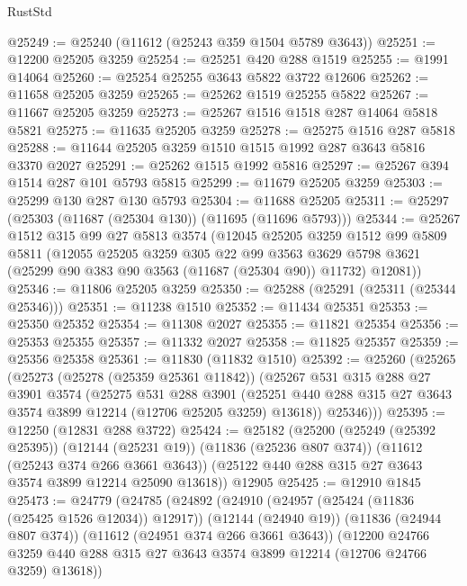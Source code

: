 \begin{lexlean}{RustStd}
\begin{coremodule}
@25249 := @25240 (@11612 (@25243 @359 @1504 @5789 @3643))
@25251 := @12200 @25205 @3259
@25254 := @25251 @420 @288 @1519
@25255 := @1991 @14064
@25260 := @25254 @25255 @3643 @5822 @3722 @12606
@25262 := @11658 @25205 @3259
@25265 := @25262 @1519 @25255 @5822
@25267 := @11667 @25205 @3259
@25273 := @25267 @1516 @1518 @287 @14064 @5818 @5821
@25275 := @11635 @25205 @3259
@25278 := @25275 @1516 @287 @5818
@25288 := @11644 @25205 @3259 @1510 @1515 @1992 @287 @3643 @5816 @3370 @2027
@25291 := @25262 @1515 @1992 @5816
@25297 := @25267 @394 @1514 @287 @101 @5793 @5815
@25299 := @11679 @25205 @3259
@25303 := @25299 @130 @287 @130 @5793
@25304 := @11688 @25205
@25311 := @25297 (@25303 (@11687 (@25304 @130)) (@11695 (@11696 @5793)))
@25344 := @25267
    @1512
    @315
    @99
    @27
    @5813
    @3574
    (@12045
      @25205
      @3259
      @1512
      @99
      @5809
      @5811
      (@12055
        @25205
        @3259
        @305
        @22
        @99
        @3563
        @3629
        @5798
        @3621
        (@25299 @90 @383 @90 @3563 (@11687 (@25304 @90)) @11732)
        @12081))
@25346 := @11806 @25205 @3259
@25350 := @25288 (@25291 (@25311 (@25344 @25346)))
@25351 := @11238 @1510
@25352 := @11434 @25351
@25353 := @25350 @25352
@25354 := @11308 @2027
@25355 := @11821 @25354
@25356 := @25353 @25355
@25357 := @11332 @2027
@25358 := @11825 @25357
@25359 := @25356 @25358
@25361 := @11830 (@11832 @1510)
@25392 := @25260
    (@25265
      (@25273
        (@25278 (@25359 @25361 @11842))
        (@25267
          @531
          @315
          @288
          @27
          @3901
          @3574
          (@25275
            @531
            @288
            @3901
            (@25251 @440 @288 @315 @27 @3643 @3574 @3899 @12214 (@12706 @25205 @3259) @13618))
          @25346)))
@25395 := @12250 (@12831 @288 @3722)
@25424 := @25182
    (@25200
      (@25249 (@25392 @25395))
      (@12144 (@25231 @19))
      (@11836 (@25236 @807 @374))
      (@11612 (@25243 @374 @266 @3661 @3643))
      (@25122 @440 @288 @315 @27 @3643 @3574 @3899 @12214 @25090 @13618))
    @12905
@25425 := @12910 @1845
@25473 := @24779
    (@24785
      (@24892
        (@24910
          (@24957 (@25424 (@11836 (@25425 @1526 @12034)) @12917))
          (@12144 (@24940 @19))
          (@11836 (@24944 @807 @374))
          (@11612 (@24951 @374 @266 @3661 @3643))
          (@12200
            @24766
            @3259
            @440
            @288
            @315
            @27
            @3643
            @3574
            @3899
            @12214
            (@12706 @24766 @3259)
            @13618))

\end{coremodule}
\end{lexlean}
